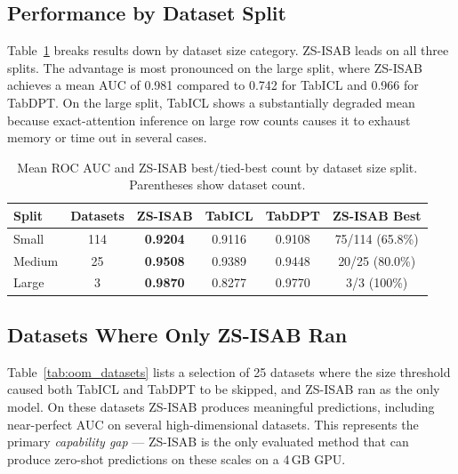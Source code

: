 \documentclass{article}
\begin{document}
\subsection{Performance by Dataset Split}

Table~\ref{tab:by_split} breaks results down by dataset size category. ZS-ISAB leads on all three splits. The advantage is most pronounced on the large split, where ZS-ISAB achieves a mean AUC of 0.981 compared to 0.742 for TabICL and 0.966 for TabDPT. On the large split, TabICL shows a substantially degraded mean because exact-attention inference on large row counts causes it to exhaust memory or time out in several cases.

\begin{table}[htbp]
\centering
\caption{Mean ROC AUC and ZS-ISAB best/tied-best count by dataset size split. Parentheses show dataset count.}
\label{tab:by_split}
\small
\begin{tabular}{@{}lccccc@{}}
\toprule
\textbf{Split} & \textbf{Datasets} & \textbf{ZS-ISAB} & \textbf{TabICL} & \textbf{TabDPT} & \textbf{ZS-ISAB Best} \\
\midrule
Small  & 114 & \textbf{0.9204} & 0.9116 & 0.9108 & 75/114 (65.8\%) \\
Medium & 25  & \textbf{0.9508} & 0.9389 & 0.9448 & 20/25 (80.0\%) \\
Large  & 3   & \textbf{0.9870} & 0.8277 & 0.9770 & 3/3 (100\%) \\
\bottomrule
\end{tabular}
\end{table}

\subsection{Datasets Where Only ZS-ISAB Ran}

Table~\ref{tab:oom_datasets} lists a selection of 25 datasets where the size threshold caused both TabICL and TabDPT to be skipped, and ZS-ISAB ran as the only model. On these datasets ZS-ISAB produces meaningful predictions, including near-perfect AUC on several high-dimensional datasets. This represents the primary \emph{capability gap} --- ZS-ISAB is the only evaluated method that can produce zero-shot predictions on these scales on a 4\,GB GPU.
\end{document}
